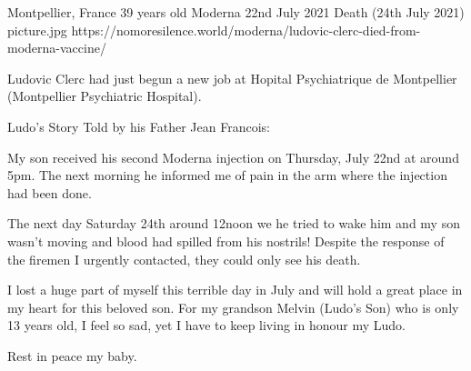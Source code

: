 {Montpellier, France}
{39 years old}
{Moderna}
{22nd July 2021}
{Death (24th July 2021)}
{picture.jpg}
{https://nomoresilence.world/moderna/ludovic-clerc-died-from-moderna-vaccine/}
{

Ludovic Clerc had just begun a new job at Hopital Psychiatrique de Montpellier
(Montpellier Psychiatric Hospital).

Ludo’s Story Told by his Father Jean Francois:

My son received his second Moderna injection on Thursday, July 22nd at around
5pm. The next morning he informed me of pain in the arm where the injection had
been done.

The next day Saturday 24th around 12noon we he tried to wake him and my son
wasn’t moving and blood had spilled from his nostrils! Despite the response of
the firemen I urgently contacted, they could only see his death.

I lost a huge part of myself this terrible day in July and will hold a great
place in my heart for this beloved son.  For my grandson Melvin (Ludo’s Son) who
is only 13 years old, I feel so sad, yet I have to keep living in honour my
Ludo.

Rest in peace my baby.

}
